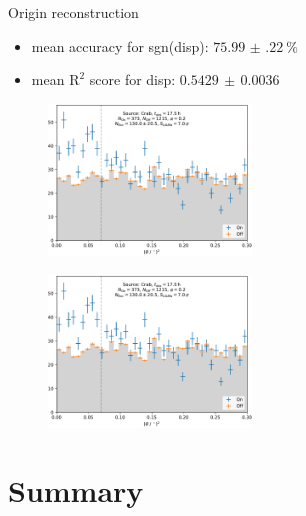 \begin{frame}[t]{Origin reconstruction}
\begin{itemize}
    \item mean accuracy for sgn(disp): $\SI{75.99(22)}{\percent}$
    \item mean $\text{R}^2$ score for disp: $0.5429\,\pm\,0.0036$
\end{itemize}
\begin{multicols}{2}
\begin{figure}
    \centering
    \includegraphics[width=0.48\textwidth]{fig/theta_whole.pdf}
\end{figure}
\columnbreak
\begin{figure}
    \centering
    \includegraphics[width=0.48\textwidth]{fig/theta_whole.pdf}
\end{figure}
\end{multicols}
\end{frame}


\section{Summary}



